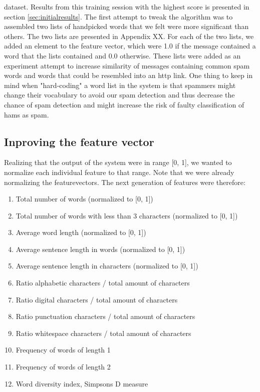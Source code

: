     dataset. Results from this training session with the highest score is
    presented in section \ref{sec:initialresults}. 
    The first attempt to tweak the algorithm was to assembled two lists of
    handpicked words that we felt were more significant than others. The two
    lists are presented in Appendix XX. For each of the two lists, we added an
    element to the feature vector, which were 1.0 if the message contained a
    word that the lists contained and 0.0 otherwise.   
    These lists were added as an experiment attempt to increase similarity of
    messages containing common spam words and words that could be resembled
    into an http link.
    One thing to keep in mind when "hard-coding" a word list in the system  is
    that spammers might change their vocabulary to avoid our spam detection and
    thus decrease the chance of spam detection and might increase the risk of
    faulty classification of hams as spam. 

  \subsection{Inproving the feature vector}
    Realizing that the output of the system were in range [0, 1], we wanted to
    normalize each individual feature to that range. Note that we were already
    normalizing the featurevectors. The next generation of features were
    therefore:
    \begin{enumerate}
      \item Total number of words (normalized to [0, 1])
      \item Total number of words with less than 3 characters 
        (normalized to [0, 1]) 
      \item Average word length 
        (normalized to [0, 1]) 
      \item Average sentence length in words
        (normalized to [0, 1]) 
      \item Average sentence length in characters
        (normalized to [0, 1]) 
      \item Ratio alphabetic characters / total amount of characters
      \item Ratio digital characters / total amount of characters
      \item Ratio punctuation characters / total amount of characters
      \item Ratio whitespace characters / total amount of characters
      \item Frequency of words of length 1
      \item Frequency of words of length 2
      \item Word diversity index, Simpsons D measure \cite{simpsons-measure}
    \end{enumerate}
  

